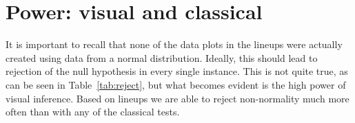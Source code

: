 \documentclass{article}\usepackage[]{graphicx}\usepackage[]{color}
\begin{document}






\section{Power: visual and classical}\label{sec:power2}

It is important to recall that none of the data plots in the lineups were actually created using data from a normal distribution. Ideally, this should lead to rejection of the null hypothesis in every single instance.
This is not quite true, as can be seen in Table~\ref{tab:reject}, but what becomes evident is the high power  of visual inference. Based on lineups we are able to reject non-normality much more often than with any of the classical tests.
\end{document}
